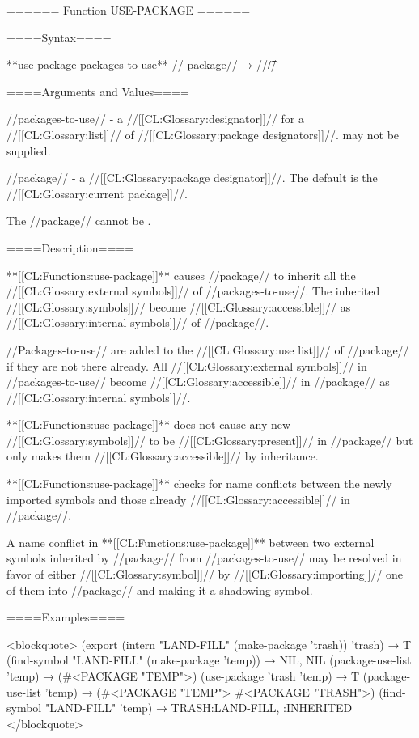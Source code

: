 ====== Function USE-PACKAGE ======

====Syntax====

**use-package {packages-to-use** //\opt} package// → //\t//

====Arguments and Values====

//packages-to-use// - a //[[CL:Glossary:designator]]// for a //[[CL:Glossary:list]]// of //[[CL:Glossary:package designators]]//.  may not be supplied.

//package// - a //[[CL:Glossary:package designator]]//. The default is the //[[CL:Glossary:current package]]//.

The //package// cannot be .

====Description====

**[[CL:Functions:use-package]]** causes //package// to inherit all the //[[CL:Glossary:external symbols]]// of //packages-to-use//. The inherited //[[CL:Glossary:symbols]]// become //[[CL:Glossary:accessible]]// as //[[CL:Glossary:internal symbols]]// of //package//.

//Packages-to-use// are added to the //[[CL:Glossary:use list]]// of //package// if they are not there already. All //[[CL:Glossary:external symbols]]// in //packages-to-use// become //[[CL:Glossary:accessible]]// in //package// as //[[CL:Glossary:internal symbols]]//.

**[[CL:Functions:use-package]]** does not cause any new //[[CL:Glossary:symbols]]// to be //[[CL:Glossary:present]]// in //package// but only makes them //[[CL:Glossary:accessible]]// by inheritance.

**[[CL:Functions:use-package]]** checks for name conflicts between the newly imported symbols and those already //[[CL:Glossary:accessible]]// in //package//.

A name conflict in **[[CL:Functions:use-package]]** between two external symbols inherited by //package// from //packages-to-use// may be resolved in favor of either //[[CL:Glossary:symbol]]// by //[[CL:Glossary:importing]]// one of them into //package// and making it a shadowing symbol.

====Examples====

<blockquote> (export (intern "LAND-FILL" (make-package 'trash)) 'trash) → T (find-symbol "LAND-FILL" (make-package 'temp)) → NIL, NIL (package-use-list 'temp) → (#<PACKAGE "TEMP">) (use-package 'trash 'temp) → T (package-use-list 'temp) → (#<PACKAGE "TEMP"> #<PACKAGE "TRASH">) (find-symbol "LAND-FILL" 'temp) → TRASH:LAND-FILL, :INHERITED </blockquote>


